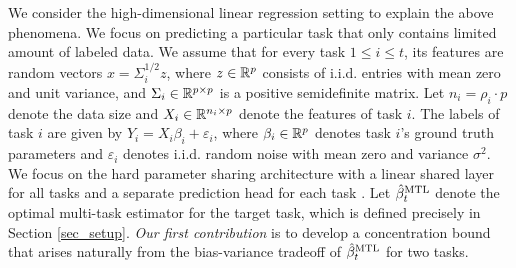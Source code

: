 We consider the high-dimensional linear regression setting \cite{HMRT19,BLLT20} to explain the above phenomena.
We focus on predicting a particular task that only contains limited amount of labeled data.
We assume that for every task $1\le i\le t$, its features are random vectors $x = \Sigma_i^{1/2}z$, where $z\in\mathbb{R}^p$ consists of i.i.d. entries with mean zero and unit variance, and $\Sigma_i\in\mathbb{R}^{p\times p}$ is a positive semidefinite matrix.
Let $n_i = \rho_i \cdot p$ denote the data size and $X_i\in\mathbb{R}^{n_i\times p}$ denote the features of task $i$.
The labels of task $i$ are given by $Y_i = X_i\beta_i + \varepsilon_i$, where $\beta_i\in\mathbb{R}^p$ denotes task $i$'s ground truth parameters and $\varepsilon_i$ denotes i.i.d. random noise with mean zero and variance $\sigma^2$.
We focus on the hard parameter sharing architecture with a linear shared layer for all tasks and a separate prediction head for each task \cite{R17,MTDNN19,WZR20}.
Let $\hat{\beta}_t^{\text{MTL}}$ denote the optimal multi-task estimator for the target task, which is defined precisely in Section \ref{sec_setup}.
\textit{Our first contribution} is to develop a concentration bound that arises naturally from the bias-variance tradeoff of $\hat{\beta}_t^{\text{MTL}}$ for two tasks.

